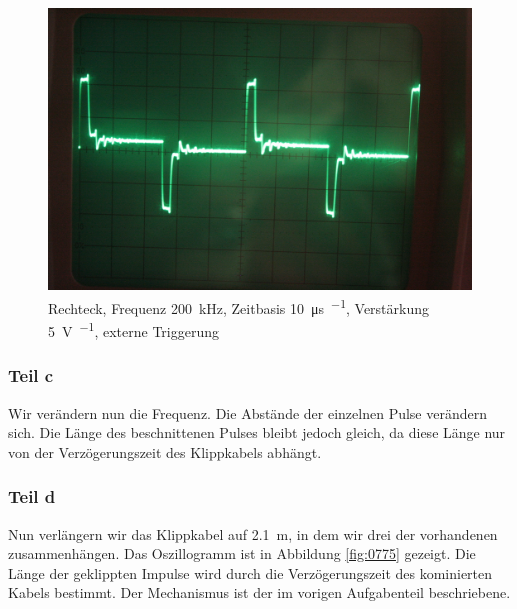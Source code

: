 \begin{figure}
	\centering
	\begin{minipage}{.45\linewidth}
	\end{minipage}
	\hfill
	\begin{minipage}{.45\linewidth}
	\includegraphics[width=\linewidth]{Fotos/IMG_0774-1500.jpg}
	\end{minipage}
	\caption{%
		Rechteck, Frequenz \SI{200}{\kilo\hertz},
		Zeitbasis \SI{10}{\micro\second\per\division},
		Verstärkung \SI{5}{\volt\per\division},
		externe Triggerung
	}
	\label{fig:0774}
\end{figure}

\FloatBarrier
\subsubsection{Teil c}

Wir verändern nun die Frequenz. Die Abstände der einzelnen Pulse verändern
sich. Die Länge des beschnittenen Pulses bleibt jedoch gleich, da diese Länge
nur von der Verzögerungszeit des Klippkabels abhängt.

\FloatBarrier
\subsubsection{Teil d}

Nun verlängern wir das Klippkabel auf \SI{2.1}{\meter}, in dem wir drei der
vorhandenen zusammenhängen. Das Oszillogramm ist in Abbildung \ref{fig:0775}
gezeigt. Die Länge der geklippten Impulse wird durch die Verzögerungszeit des
kominierten Kabels bestimmt. Der Mechanismus ist der im vorigen Aufgabenteil
beschriebene.

